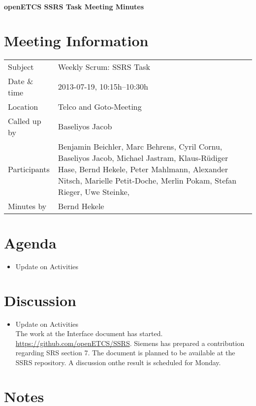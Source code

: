 \documentclass[a4paper, 11pt]{article}
\begin{document}
{\begin{center}\huge\bf openETCS SSRS Task Meeting Minutes\end{center}}
\section{Meeting Information}

\renewcommand{\arraystretch}{1.5}
\begin{supertabular}{m{.2\textwidth}m{.8\textwidth}}
Subject &  Weekly Scrum: SSRS Task\\
Date \& time & 2013-07-19, 10:15h--10:30h\\
Location & Telco and Goto-Meeting\\
Called up by & Baseliyos Jacob\\
Participants &
Benjamin Beichler,
Marc Behrens,
Cyril Cornu,
Baseliyos Jacob,
Michael Jastram,
Klaus-R\"udiger Hase,
Bernd Hekele,
Peter Mahlmann,
Alexander Nitsch,
Marielle Petit-Doche,
Merlin Pokam,
Stefan Rieger,
Uwe Steinke,
\\

Minutes by & Bernd Hekele\\

\end{supertabular}
\renewcommand{\arraystretch}{1.0}


\section{{Agenda}}
\begin{itemize}
\item Update on Activities\\
\end{itemize}

\section{Discussion}
\begin{itemize}
\item Update on Activities\\
The work at the Interface document has started. \url{https://github.com/openETCS/SSRS}.
Siemens has prepared a contribution regarding SRS section 7. The document is planned to be available at the SSRS repository.  
A discussion onthe result is scheduled for Monday.

\end{itemize}


\section{Notes}
\end{document}
